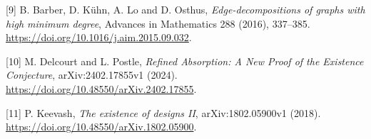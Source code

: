 \documentclass[english,11pt,a4paper]{article}
\begin{document}
\begin{minipage}{\linewidth}
{[}9{]} B. Barber, D. Kühn, A. Lo and D. Osthus, \emph{Edge-decompositions of graphs with high minimum degree}, Advances in Mathematics 288 (2016), 337--385. \url{https://doi.org/10.1016/j.aim.2015.09.032}.

{[}10{]} M. Delcourt and L. Postle, \emph{Refined Absorption: A New Proof of the Existence Conjecture}, arXiv:2402.17855v1 (2024). \url{https://doi.org/10.48550/arXiv.2402.17855}.

{[}11{]} P. Keevash, \emph{The existence of designs II}, arXiv:1802.05900v1 (2018). \url{https://doi.org/10.48550/arXiv.1802.05900}.

\endgroup

\end{minipage}
\end{document}
